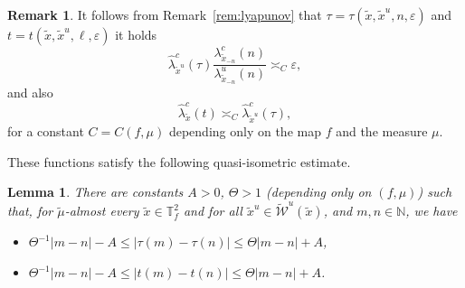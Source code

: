 \documentclass[a4paper,11pt,reqno]{amsart}
\newcommand{\N}{{\mathbb N}}
\newcommand{\TTf}{{\mathbb{T}_f^2}}
\newcommand{\cW}{{\mathcal W}}
\newcommand{\eps}{\varepsilon}
\newcommand{\tix}{\tilde{x}}
\newcommand{\w}{\widetilde{\cW}}
\newtheorem{lemma}[theorem]{Lemma}
\theoremstyle{definition}
\newtheorem{remark}{Remark}
\begin{document}
\begin{remark}
	\label{rem:black}
It follows from Remark~\ref{rem:lyapunov} that $\tau=\tau(\tix,\tix^u,n,\eps)$ and $t=t(\tix,\tix^u,\ell,\eps)$ it holds 
\[
\hat{\lambda}^c_{\tix^u}(\tau) \frac{\lambda^c_{\tix_{-n}}(n)}{\lambda^u_{\tix_{-n}}(n)}\asymp_{C}\eps,
\]
and also
\[
\hat{\lambda}^c_{\tix}(t)\asymp_{C}\hat{\lambda}^c_{\tix^u}(\tau),
\]
for a constant $C=C(f,\mu)$ depending only on the map $f$ and the measure $\mu$.
\end{remark}


These functions satisfy the following quasi-isometric estimate.

\begin{lemma}
\label{lem:quasiisometric}
There are constants $A >0$, $\Theta > 1$ (depending only on $(f,\mu)$) such that, for $\tilde{\mu}$-almost every $\tix \in \TTf$ and for all $\tix^u \in \w^u(\tix)$, and $m,n \in \N$, we have
\begin{itemize}
	\item $\Theta^{-1}|m - n|-A\leq|\tau(m)-\tau(n)|\leq \Theta|m - n|+A$,
	\item $\Theta^{-1}|m - n|-A\leq|t(m)-t(n)|\leq \Theta|m - n|+A$.
\end{itemize}
\end{lemma}
\end{document}
